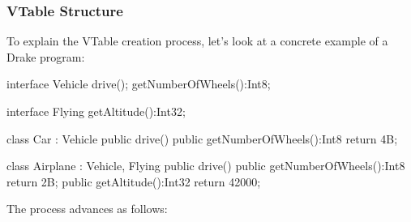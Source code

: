 \documentclass{article}
\newcommand{\plname}[0]{Drake\xspace}
\begin{document}
\subsubsection{VTable Structure}
\label{sec:VTableStructure}
To explain the VTable creation process, let's look at a concrete example of a \plname program:
\begin{sooplisting}
interface Vehicle {
	drive();
	getNumberOfWheels():Int8;
}

interface Flying {
	getAltitude():Int32;
}

class Car : Vehicle {
	public drive() { }
	public getNumberOfWheels():Int8 { return 4B; }
}

class Airplane : Vehicle, Flying {
	public drive() { }
	public getNumberOfWheels():Int8 { return 2B; }
	public getAltitude():Int32 { return 42000; }
}
\end{sooplisting}
The process advances as follows:
\end{document}
